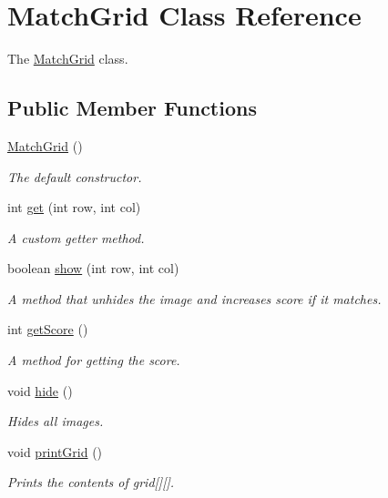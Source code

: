 \hypertarget{class_match_grid}{}\section{Match\+Grid Class Reference}
\label{class_match_grid}


The \mbox{\hyperlink{class_match_grid}{Match\+Grid}} class.  


\subsection*{Public Member Functions}
\begin{DoxyCompactItemize}
\item 
\mbox{\hyperlink{class_match_grid_acfd92ec568e826d6ea23fb7d2bb92800}{Match\+Grid}} ()
\begin{DoxyCompactList}\small\item\em The default constructor. \end{DoxyCompactList}\item 
int \mbox{\hyperlink{class_match_grid_a3ac68858317325bcd611aa811dab54ad}{get}} (int row, int col)
\begin{DoxyCompactList}\small\item\em A custom getter method. \end{DoxyCompactList}\item 
boolean \mbox{\hyperlink{class_match_grid_adc3b7a588c1b58a737f3ef45a10a7888}{show}} (int row, int col)
\begin{DoxyCompactList}\small\item\em A method that unhides the image and increases score if it matches. \end{DoxyCompactList}\item 
int \mbox{\hyperlink{class_match_grid_a39fcc7cc9b094d95d2aee459c9e287df}{get\+Score}} ()
\begin{DoxyCompactList}\small\item\em A method for getting the score. \end{DoxyCompactList}\item 
void \mbox{\hyperlink{class_match_grid_ada04481d2f01ef0011a7bb4707d2b911}{hide}} ()
\begin{DoxyCompactList}\small\item\em Hides all images. \end{DoxyCompactList}\item 
void \mbox{\hyperlink{class_match_grid_a67c79ef33744f135e5a9b483bf5e369f}{print\+Grid}} ()
\begin{DoxyCompactList}\small\item\em Prints the contents of grid\mbox{[}\mbox{]}\mbox{[}\mbox{]}. \end{DoxyCompactList}\end{DoxyCompactItemize}


